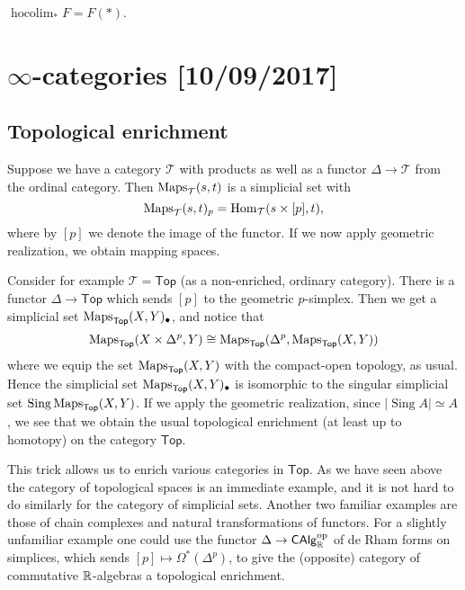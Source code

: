 \documentclass{amsart}
\DeclareMathOperator{\Sing}{Sing}
\DeclareMathOperator{\hocolim}{hocolim}
\begin{document}
\begin{exercise}
    $\hocolim_* F=F(*)$.
\end{exercise}

\newpage

\section{$\infty$-categories [10/09/2017]}

\subsection{Topological enrichment}

Suppose we have a category $\mathcal{T}$ with products as well as a functor $\Delta\to\mathcal{T}$
from the ordinal category.  Then $\operatorname{Maps}_{\mathcal{T}}(s,t)$ is a simplicial set with
\begin{equation*}
    \operatorname{Maps}_\mathcal{T}(s,t)_p = \operatorname{Hom}_\mathcal{T}(s\times [p], t),
\end{equation*}
where by $[p]$ we denote the image of the functor. If we now apply geometric realization,
we obtain mapping spaces.

Consider for example $\mathcal{T}=\mathsf{Top}$ (as a non-enriched, ordinary category).
There is a functor $\Delta\to\mathsf{Top}$ which sends $[p]$ to the geometric $p$-simplex.
Then we get a simplicial set $\operatorname{Maps}_\mathsf{Top}(X,Y)_\bullet$, and notice that
\begin{equation*}
    \operatorname{Maps}_\mathsf{Top}(X\times\Delta^p, Y) \cong \operatorname{Maps}_\mathsf{Top}(\Delta^p, \operatorname{Maps}_\mathsf{Top}(X,Y))
\end{equation*}
where we equip the set $\operatorname{Maps}_\mathsf{Top}(X,Y)$ with the compact-open topology, as usual.
Hence the simplicial set $\operatorname{Maps}_\mathsf{Top}(X,Y)_\bullet$ is isomorphic to the singular
simplicial set $\Sing\Maps_\mathsf{Top}(X,Y)$. If we apply the geometric realization,
since $|\Sing A|\simeq A$, we see that we obtain the usual topological enrichment (at least
up to homotopy) on the category $\mathsf{Top}$.


This trick allows us to enrich various categories in $\mathsf{Top}$. As we have seen above
the category of topological spaces is an immediate example, and it is not hard to do
similarly for the category of simplicial sets. Another two familiar examples are
those of chain complexes and natural transformations of functors. For a slightly
unfamiliar example one could use the functor $\Delta\to \mathsf{CAlg}_{\mathbb{R}}^\text{op}$
of de Rham forms on simplices, which sends $[p]\mapsto\Omega^*(\Delta^p)$, to give
the (opposite) category of commutative $\mathbb{R}$-algebras a topological enrichment.
\end{document}
